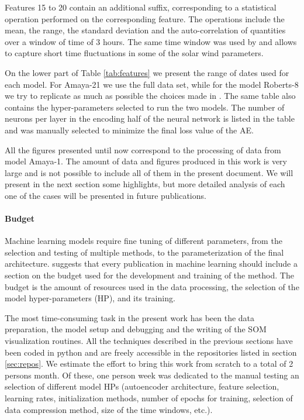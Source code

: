 Features 15 to 20 contain an additional suffix, corresponding to a statistical operation performed on the corresponding feature. The operations include the mean, the range, the standard deviation and the auto-correlation of quantities over a window of time of 3 hours. The same time window was used by \citep{Roberts2020} and allows to capture short time fluctuations in some of the solar wind parameters.

On the lower part of Table \ref{tab:features} we present the range of dates used for each model. For Amaya-21 we use the full data set, while for the model Roberts-8 we try to replicate as much as possible the choices made in \citep{Roberts2020}. The same table also contains the hyper-parameters selected to run the two models. The number of neurons per layer in the encoding half of the neural network is listed in the table and was manually selected to minimize the final loss value of the AE.

All the figures presented until now correspond to the processing of data from model Amaya-1. The amount of data and figures produced in this work is very large and is not possible to include all of them in the present document. We will present in the next section some highlights, but more detailed analysis of each one of the cases will be presented in future publications.

\paragraph{Budget}
Machine learning models require fine tuning of different parameters, from the selection and testing of multiple methods, to the parameterization of the final architecture. \citep{Dodge2019} suggests that every publication in machine learning should include a section on the budget used for the development and training of the method. The budget is the amount of resources used in the data processing, the selection of the model hyper-parameters (HP), and its training.

The most time-consuming task in the present work has been the data preparation, the model setup and debugging and the writing of the SOM visualization routines. All the techniques described in the previous sections have been coded in python and are freely accessible in the repositories listed in section \ref{sec:repos}. We estimate the effort to bring this work from scratch to a total of 2 persons month. Of these, one person week was dedicated to the manual testing an selection of different model HPs (autoencoder architecture, feature selection, learning rates, initialization methods, number of epochs for training, selection of data compression method, size of the time windows, etc.).

